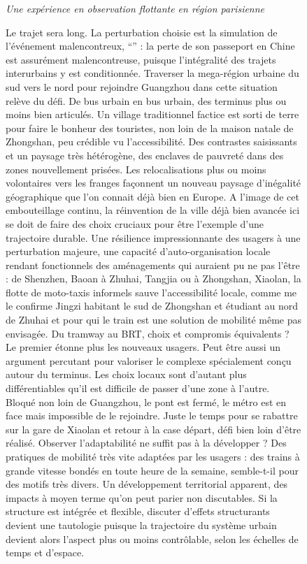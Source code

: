 \begin{figure}[h!]
\begin{mdframed}
\medskip

 \textit{Une expérience en observation flottante en région parisienne}
\end{mdframed}
\end{figure}




\begin{figure}[h!]
\begin{mdframed}
Le trajet sera long. La perturbation choisie est la simulation de l'événement malencontreux, ``'' : la perte de son passeport en Chine est assurément malencontreuse, puisque l'intégralité des trajets interurbains y est conditionnée. Traverser la mega-région urbaine du sud vers le nord pour rejoindre Guangzhou dans cette situation relève du défi. De bus urbain en bus urbain, des terminus plus ou moins bien articulés. Un village traditionnel factice est sorti de terre pour faire le bonheur des touristes, non loin de la maison natale de Zhongshan, peu crédible vu l'accessibilité. Des contrastes saisissants et un paysage très hétérogène, des enclaves de pauvreté dans des zones nouvellement prisées. Les relocalisations plus ou moins volontaires vers les franges façonnent un nouveau paysage d'inégalité géographique que l'on connait déjà bien en Europe. A l'image de cet embouteillage continu, la réinvention de la ville déjà bien avancée ici se doit de faire des choix cruciaux pour être l'exemple d'une trajectoire durable. Une résilience impressionnante des usagers à une perturbation majeure, une capacité d'auto-organisation locale rendant fonctionnels des aménagements qui auraient pu ne pas l'être : de Shenzhen, Baoan à Zhuhai, Tangjia ou à Zhongshan, Xiaolan, la flotte de moto-taxis informels sauve l'accessibilité locale, comme me le confirme Jingzi habitant le sud de Zhongshan et étudiant au nord de Zhuhai et pour qui le train est une solution de mobilité même pas envisagée. Du tramway au BRT, choix et compromis équivalents ? Le premier étonne plus les nouveaux usagers. Peut être aussi un argument percutant pour valoriser le complexe spécialement conçu autour du terminus. Les choix locaux sont d'autant plus différentiables qu'il est difficile de passer d'une zone à l'autre. Bloqué non loin de Guangzhou, le pont est fermé, le métro est en face mais impossible de le rejoindre. Juste le temps pour se rabattre sur la gare de Xiaolan et retour à la case départ, défi bien loin d'être réalisé. Observer l'adaptabilité ne suffit pas à la développer ? Des pratiques de mobilité très vite adaptées par les usagers : des trains à grande vitesse bondés en toute heure de la semaine, semble-t-il pour des motifs très divers. Un développement territorial apparent, des impacts à moyen terme qu'on peut parier non discutables. Si la structure est intégrée et flexible, discuter d'effets structurants devient une tautologie puisque la trajectoire du système urbain devient alors l'aspect plus ou moins contrôlable, selon les échelles de temps et d'espace.



\end{mdframed}
\end{figure}

